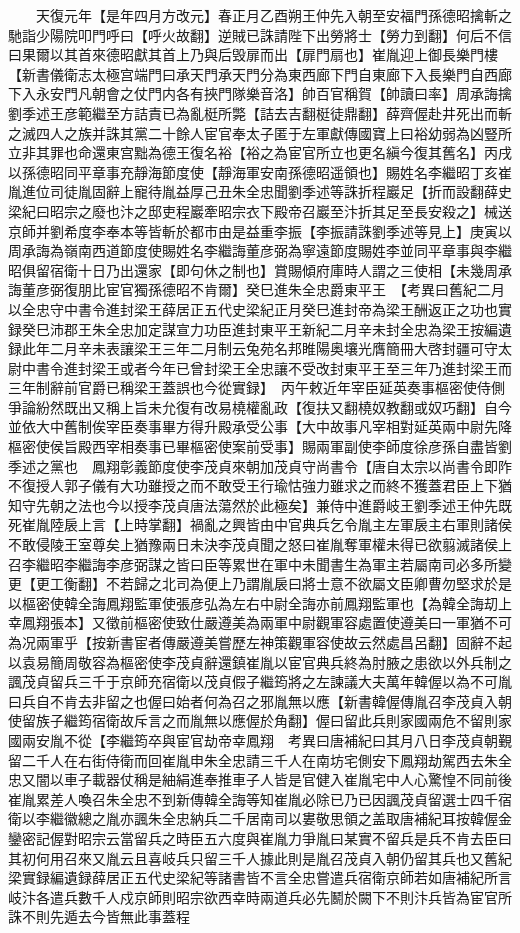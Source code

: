 　　天復元年【是年四月方改元】春正月乙酉朔王仲先入朝至安福門孫德昭擒斬之馳詣少陽院叩門呼曰【呼火故翻】逆賊已誅請陛下出勞將士【勞力到翻】何后不信曰果爾以其首來德昭獻其首上乃與后毁扉而出【扉門扇也】崔胤迎上御長樂門樓【新書儀衛志太極宫端門曰承天門承天門分為東西廊下門自東廊下入長樂門自西廊下入永安門凡朝會之仗門内各有挾門隊樂音洛】帥百官稱賀【帥讀曰率】周承誨擒劉季述王彦範繼至方詰責已為亂梃所斃【詰去吉翻梃徒鼎翻】薛齊偓赴井死出而斬之滅四人之族并誅其黨二十餘人宦官奉太子匿于左軍獻傳國寶上曰裕幼弱為凶豎所立非其罪也命還東宫黜為德王復名裕【裕之為宦官所立也更名縝今復其舊名】丙戌以孫德昭同平章事充靜海節度使【靜海軍安南孫德昭遥領也】賜姓名李繼昭丁亥崔胤進位司徒胤固辭上寵待胤益厚己丑朱全忠聞劉季述等誅折程巖足【折而設翻薛史梁紀曰昭宗之廢也汴之邸吏程巖牽昭宗衣下殿帝召巖至汴折其足至長安殺之】械送京師并劉希度李奉本等皆斬於都市由是益重李振【李振請誅劉季述等見上】庚寅以周承誨為嶺南西道節度使賜姓名李繼誨董彦弼為寧遠節度賜姓李並同平章事與李繼昭俱留宿衛十日乃出還家【即句休之制也】賞賜傾府庫時人謂之三使相【未幾周承誨董彦弼復朋比宦官獨孫德昭不肯爾】癸巳進朱全忠爵東平王　【考異曰舊紀二月以全忠守中書令進封梁王薛居正五代史梁紀正月癸巳進封帝為梁王酬返正之功也實録癸巳沛郡王朱全忠加定謀宣力功臣進封東平王新紀二月辛未封全忠為梁王按編遺録此年二月辛未表讓梁王三年二月制云兔苑名邦睢陽奥壤光膺簡冊大啓封疆可守太尉中書令進封梁王或者今年已曾封梁王全忠讓不受改封東平王至三年乃進封梁王而三年制辭前官爵已稱梁王蓋誤也今從實録】　丙午敕近年宰臣延英奏事樞密使侍側爭論紛然既出又稱上旨未允復有改易橈權亂政【復扶又翻橈奴教翻或奴巧翻】自今並依大中舊制俟宰臣奏事畢方得升殿承受公事【大中故事凡宰相對延英兩中尉先降樞密使侯旨殿西宰相奏事已畢樞密使案前受事】賜兩軍副使李師度徐彦孫自盡皆劉季述之黨也　鳳翔彰義節度使李茂貞來朝加茂貞守尚書令【唐自太宗以尚書令即阼不復授人郭子儀有大功雖授之而不敢受王行瑜怙強力雖求之而終不獲蓋君臣上下猶知守先朝之法也今以授李茂貞唐法蕩然於此極矣】兼侍中進爵岐王劉季述王仲先既死崔胤陸扆上言【上時掌翻】禍亂之興皆由中官典兵乞令胤主左軍扆主右軍則諸侯不敢侵陵王室尊矣上猶豫兩日未決李茂貞聞之怒曰崔胤奪軍權未得已欲翦滅諸侯上召李繼昭李繼誨李彦弼謀之皆曰臣等累世在軍中未聞書生為軍主若屬南司必多所變更【更工衡翻】不若歸之北司為便上乃謂胤扆曰將士意不欲屬文臣卿曹勿堅求於是以樞密使韓全誨鳳翔監軍使張彦弘為左右中尉全誨亦前鳳翔監軍也【為韓全誨刧上幸鳳翔張本】又徵前樞密使致仕嚴遵美為兩軍中尉觀軍容處置使遵美曰一軍猶不可為况兩軍乎【按新書宦者傳嚴遵美嘗歷左神策觀軍容使故云然處昌呂翻】固辭不起以袁易簡周敬容為樞密使李茂貞辭還鎮崔胤以宦官典兵終為肘腋之患欲以外兵制之諷茂貞留兵三千于京師充宿衛以茂貞假子繼筠將之左諫議大夫萬年韓偓以為不可胤曰兵自不肯去非留之也偓曰始者何為召之邪胤無以應【新書韓偓傳胤召李茂貞入朝使留族子繼筠宿衛故斥言之而胤無以應偓於角翻】偓曰留此兵則家國兩危不留則家國兩安胤不從【李繼筠卒與宦官劫帝幸鳳翔　考異曰唐補紀曰其月八日李茂貞朝覲留二千人在右街侍衛而回崔胤申朱全忠請三千人在南坊宅側安下鳳翔劫駕西去朱全忠又闇以車子載器仗稱是紬絹進奉推車子人皆是官健入崔胤宅中人心驚惶不同前後崔胤累差人喚召朱全忠不到新傳韓全誨等知崔胤必除已乃已因諷茂貞留選士四千宿衛以李繼徽總之胤亦諷朱全忠納兵二千居南司以婁敬思領之盖取唐補紀耳按韓偓金鑾密記偓對昭宗云當留兵之時臣五六度與崔胤力爭胤曰某實不留兵是兵不肯去臣曰其初何用召來又胤云且喜岐兵只留三千人據此則是胤召茂貞入朝仍留其兵也又舊紀梁實録編遺録薛居正五代史梁紀等諸書皆不言全忠嘗遣兵宿衛京師若如唐補紀所言岐汴各遣兵數千人戍京師則昭宗欲西幸時兩道兵必先鬭於闕下不則汴兵皆為宦官所誅不則先遁去今皆無此事蓋程